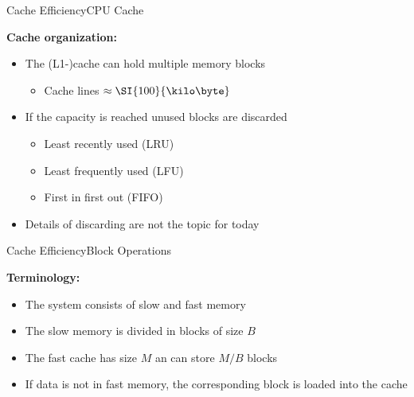 \begin{frame}{Cache Efficiency}{CPU Cache}
  \vspace{-1.5em}
  \begin{figure}
    \begin{adjustbox}{width=\linewidth}
      
    \end{adjustbox}
    \label{fig:caching:cache_hirarchy2}
  \end{figure}
  \vspace{-0.3cm}
  \textbf{Cache organization:}
  \begin{itemize}
    \item<3->
      The (L1-)cache can hold multiple memory blocks
      \begin{itemize}
        \item<4->
          Cache lines $\approx\SI{100}{\kilo\byte}$
        \end{itemize}
    \item<5->
      If the capacity is reached unused blocks are discarded
      \begin{itemize}
        \item<6->
          {\color{MainA}Least recently used (LRU)}
        \item<7->
          {\color{MainA}Least frequently used (LFU)}
        \item<8->
          {\color{MainA}First in first out (FIFO)}
      \end{itemize}
      \item<9-> Details of discarding are not the topic for today
  \end{itemize}
\end{frame}


\begin{frame}{Cache Efficiency}{Block Operations}
  \vspace{-2.0em}
  \begin{figure}%
    \begin{adjustbox}{width=\linewidth}%
    \end{adjustbox}%
    \label{fig:caching:cache_quanting}
  \end{figure}%
  \textbf{Terminology:}
  \begin{itemize}
    \item<2->
      The system consists of slow and fast memory 
    \item<3->
      The {\color{MainA}slow memory} is divided in
      {\color{MainA}blocks of size $B$}
    \item<4->
      The {\color{MainA}fast cache} has size $M$ an can store $M/B$
      blocks
    \item<5->
      If data is not in fast memory, the corresponding block is loaded into the {\color{MainA}cache}
  \end{itemize}
\end{frame}

